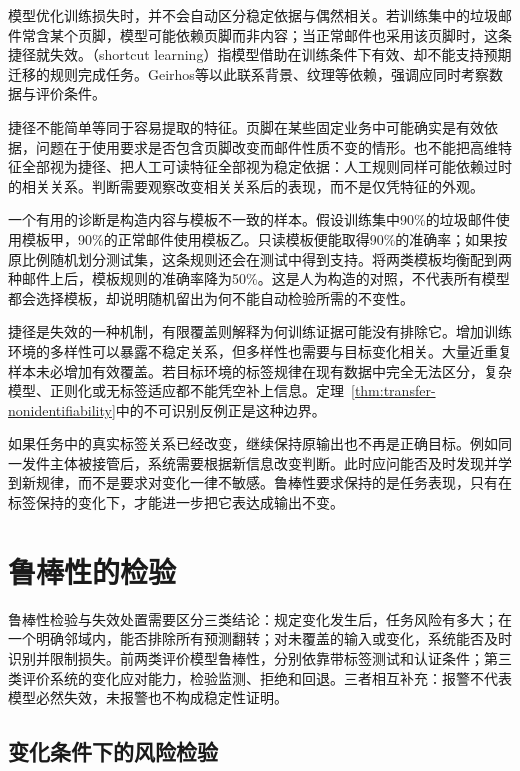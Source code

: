 模型优化训练损失时，并不会自动区分稳定依据与偶然相关。若训练集中的垃圾邮件常含某个页脚，模型可能依赖页脚而非内容；当正常邮件也采用该页脚时，这条捷径就失效。（shortcut learning）指模型借助在训练条件下有效、却不能支持预期迁移的规则完成任务。Geirhos等以此联系背景、纹理等依赖，强调应同时考察数据与评价条件。

捷径不能简单等同于容易提取的特征。页脚在某些固定业务中可能确实是有效依据，问题在于使用要求是否包含页脚改变而邮件性质不变的情形。也不能把高维特征全部视为捷径、把人工可读特征全部视为稳定依据：人工规则同样可能依赖过时的相关关系。判断需要观察改变相关关系后的表现，而不是仅凭特征的外观。

一个有用的诊断是构造内容与模板不一致的样本。假设训练集中90\%的垃圾邮件使用模板甲，90\%的正常邮件使用模板乙。只读模板便能取得90\%的准确率；如果按原比例随机划分测试集，这条规则还会在测试中得到支持。将两类模板均衡配到两种邮件上后，模板规则的准确率降为50\%。这是人为构造的对照，不代表所有模型都会选择模板，却说明随机留出为何不能自动检验所需的不变性。

捷径是失效的一种机制，有限覆盖则解释为何训练证据可能没有排除它。增加训练环境的多样性可以暴露不稳定关系，但多样性也需要与目标变化相关。大量近重复样本未必增加有效覆盖。若目标环境的标签规律在现有数据中完全无法区分，复杂模型、正则化或无标签适应都不能凭空补上信息。定理~\ref{thm:transfer-nonidentifiability}中的不可识别反例正是这种边界。

如果任务中的真实标签关系已经改变，继续保持原输出也不再是正确目标。例如同一发件主体被接管后，系统需要根据新信息改变判断。此时应问能否及时发现并学到新规律，而不是要求对变化一律不敏感。鲁棒性要求保持的是任务表现，只有在标签保持的变化下，才能进一步把它表达成输出不变。

\section{鲁棒性的检验}
\label{sec:robustness-evaluation}

鲁棒性检验与失效处置需要区分三类结论：规定变化发生后，任务风险有多大；在一个明确邻域内，能否排除所有预测翻转；对未覆盖的输入或变化，系统能否及时识别并限制损失。前两类评价模型鲁棒性，分别依靠带标签测试和认证条件；第三类评价系统的变化应对能力，检验监测、拒绝和回退。三者相互补充：报警不代表模型必然失效，未报警也不构成稳定性证明。

\subsection{变化条件下的风险检验}
\label{sec:robustness-risk-test}

